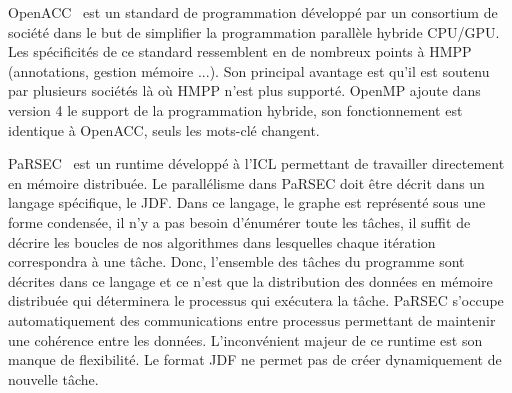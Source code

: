 OpenACC~\cite{OpenACC} est un standard de programmation développé par un consortium de société dans le but de simplifier la programmation parallèle hybride CPU/GPU.
%
Les spécificités de ce standard ressemblent en de nombreux points à HMPP (annotations, gestion mémoire ...).
%
Son principal avantage est qu'il est soutenu par plusieurs sociétés là où HMPP n'est plus supporté.
%
OpenMP ajoute dans version 4 le support de la programmation hybride, son fonctionnement est identique à OpenACC, seuls les mots-clé changent.



PaRSEC~\cite{PaRSEC} est un runtime développé à l'ICL permettant de travailler directement en mémoire distribuée.
%
Le parallélisme dans PaRSEC doit être décrit dans un langage spécifique, le JDF.
%
Dans ce langage, le graphe est représenté sous une forme condensée, il n'y a pas besoin d'énumérer toute les tâches, il suffit de décrire les boucles de nos algorithmes dans lesquelles chaque itération correspondra à une tâche.
%
Donc, l'ensemble des tâches du programme sont décrites dans ce langage et ce n'est que la distribution des données en mémoire distribuée qui déterminera le processus qui exécutera la tâche.
%
PaRSEC s'occupe automatiquement des communications entre processus permettant de maintenir une cohérence entre les données.
%
L'inconvénient majeur de ce runtime est son manque de flexibilité.
%
Le format JDF ne permet pas de créer dynamiquement de nouvelle tâche.
